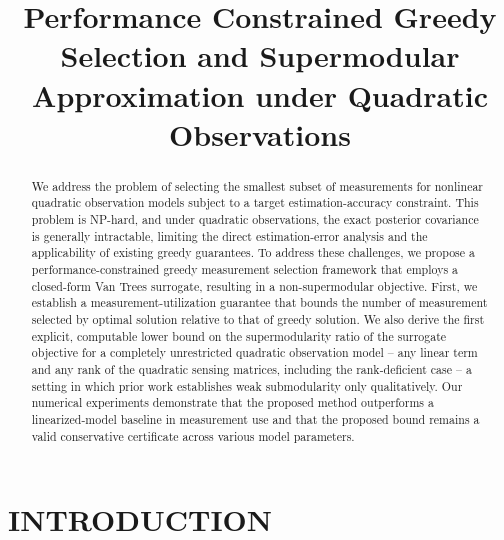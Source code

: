 \documentclass[letterpaper, 10 pt, conference]{ieeeconf}  %
\title{\LARGE \bf
Performance Constrained Greedy Selection and Supermodular Approximation under Quadratic Observations
}
\author{Wooyeong Cho, Tengyou Xu, Kaden Bautista and Ankur Mehta$%
\thanks{Department of Electrical and Computer Engineering,
University of California Los Angeles, Los Angeles, CA, USA.
        {\tt\small {chowy1628,tengyoux,kadenbautista21,mehtank} @ucla.edu}}%
}
\begin{document}
\maketitle
\thispagestyle{empty}
\pagestyle{empty}


\begin{abstract}
We address the problem of selecting the smallest subset of measurements for nonlinear quadratic observation models subject to a target estimation-accuracy constraint. This problem is NP-hard, and under quadratic observations, the exact posterior covariance is generally intractable, limiting the direct estimation-error analysis and the applicability of existing greedy guarantees. To address these challenges, we propose a performance-constrained greedy measurement selection framework that employs a closed-form Van Trees surrogate, resulting in a non-supermodular objective. First, we establish a measurement-utilization guarantee that bounds the number of measurement selected by optimal solution relative to that of greedy solution. We also derive the first explicit, computable lower bound on the supermodularity ratio of the surrogate objective for a completely unrestricted quadratic observation model -- any linear term and any rank of the quadratic sensing matrices, including the rank-deficient case -- a setting in which prior work establishes weak submodularity only qualitatively. Our numerical experiments demonstrate that the proposed method outperforms a linearized-model baseline in measurement use and that the proposed bound remains a valid conservative certificate across various model parameters.

\end{abstract}
\section{INTRODUCTION}
\end{document}
